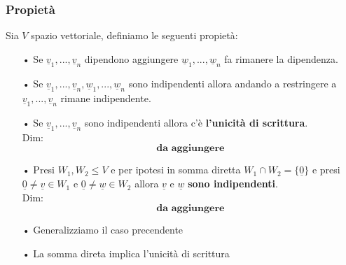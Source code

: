 \subsubsection{Propietà}
Sia $V$ spazio vettoriale, definiamo le seguenti propietà:
\begin{itemize}
\item[•] Se $\underline{v}_1,...,\underline{v}_n$ dipendono aggiungere $\underline{w}_1,...,\underline{w}_n$ fa rimanere la dipendenza.

\item[•] Se $\underline{v}_1,...,\underline{v}_n, \underline{w}_1,...,\underline{w}_n$ sono indipendenti allora andando a restringere a $\underline{v}_1,...,\underline{v}_n$ rimane indipendente.

\item[•] Se $\underline{v}_1,...,\underline{v}_n$ sono indipendenti allora c'è \textbf{l'unicità di scrittura}.\\
Dim:
$$ \textbf{da aggiungere} $$

\item[•] Presi $W_1,W_2 \le V$ e per ipotesi in somma diretta $W_1 \cap W_2 = \{\underline{0}\}$ e presi $\underline{0} \neq \underline{v} \in W_1$ e $\underline{0} \neq \underline{w} \in W_2$ allora $\underline{v}$ e $\underline{w}$ \textbf{sono indipendenti}.\\
Dim:
$$ \textbf{da aggiungere} $$

\item[•] Generalizziamo il caso precendente

\item[•] La somma direta implica l'unicità di scrittura

\end{itemize}






